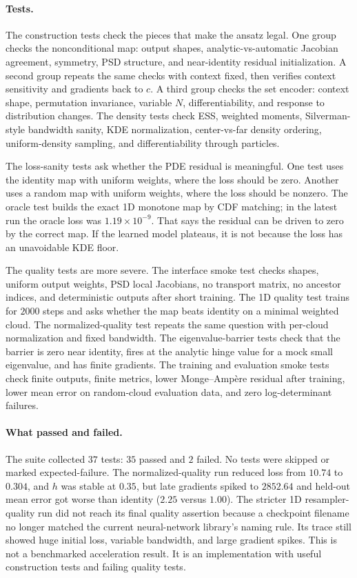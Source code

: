 \paragraph{Tests.}
The construction tests check the pieces that make the ansatz legal. One group checks the nonconditional map: output shapes, analytic-vs-automatic Jacobian agreement, symmetry, PSD structure, and near-identity residual initialization. A second group repeats the same checks with context fixed, then verifies context sensitivity and gradients back to $c$. A third group checks the set encoder: context shape, permutation invariance, variable $N$, differentiability, and response to distribution changes. The density tests check ESS, weighted moments, Silverman-style bandwidth sanity, KDE normalization, center-vs-far density ordering, uniform-density sampling, and differentiability through particles.

The loss-sanity tests ask whether the PDE residual is meaningful. One test uses the identity map with uniform weights, where the loss should be zero. Another uses a random map with uniform weights, where the loss should be nonzero. The oracle test builds the exact 1D monotone map by CDF matching; in the latest run the oracle loss was $1.19\times 10^{-9}$. That says the residual can be driven to zero by the correct map. If the learned model plateaus, it is not because the loss has an unavoidable KDE floor.

The quality tests are more severe. The interface smoke test checks shapes, uniform output weights, PSD local Jacobians, no transport matrix, no ancestor indices, and deterministic outputs after short training. The 1D quality test trains for $2000$ steps and asks whether the map beats identity on a minimal weighted cloud. The normalized-quality test repeats the same question with per-cloud normalization and fixed bandwidth. The eigenvalue-barrier tests check that the barrier is zero near identity, fires at the analytic hinge value for a mock small eigenvalue, and has finite gradients. The training and evaluation smoke tests check finite outputs, finite metrics, lower Monge--Amp\`ere residual after training, lower mean error on random-cloud evaluation data, and zero log-determinant failures.

\paragraph{What passed and failed.}
The suite collected $37$ tests: $35$ passed and $2$ failed. No tests were skipped or marked expected-failure. The normalized-quality run reduced loss from $10.74$ to $0.304$, and $h$ was stable at $0.35$, but late gradients spiked to $2852.64$ and held-out mean error got worse than identity ($2.25$ versus $1.00$). The stricter 1D resampler-quality run did not reach its final quality assertion because a checkpoint filename no longer matched the current neural-network library's naming rule. Its trace still showed huge initial loss, variable bandwidth, and large gradient spikes. This is not a benchmarked acceleration result. It is an implementation with useful construction tests and failing quality tests.


